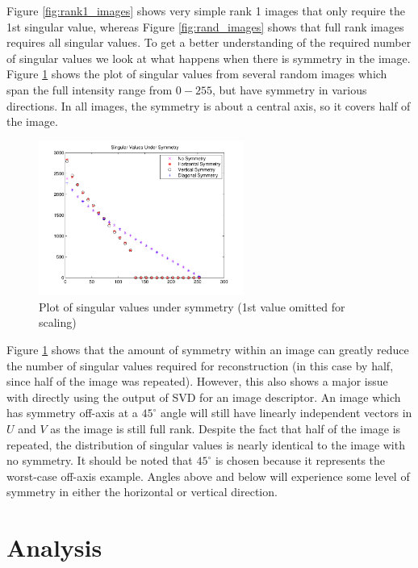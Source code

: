 \documentclass{report}
\begin{document}
Figure \ref{fig:rank1_images} shows very simple rank 1 images that only require the 1st singular value, whereas Figure \ref{fig:rand_images} shows that full rank images requires all singular values. To get a better understanding of the required number of singular values we look at what happens when there is symmetry in the image. Figure \ref{fig:rand_symmetry} shows the plot of singular values from several random images which span the full intensity range from $0-255$, but have symmetry in various directions. In all images, the symmetry is about a central axis, so it covers half of the image.

\begin{figure}[H]
        \centering
        \includegraphics[width=0.6\textwidth]{graphics/singular_values_symmetry.pdf}
        \caption{Plot of singular values under symmetry (1st value omitted for scaling)}
        \label{fig:rand_symmetry}
\end{figure}

Figure \ref{fig:rand_symmetry} shows that the amount of symmetry within an image can greatly reduce the number of singular values required for reconstruction (in this case by half, since half of the image was repeated). However, this also shows a major issue with directly using the output of SVD for an image descriptor. An image which has symmetry off-axis at a $45^\circ$ angle will still have linearly independent vectors in $U$ and $V$ as the image is still full rank. Despite the fact that half of the image is repeated, the distribution of singular values is nearly identical to the image with no symmetry. It should be noted that $45^\circ$ is chosen because it represents the worst-case off-axis example. Angles above and below will experience some level of symmetry in either the horizontal or vertical direction.

\chapter{Analysis}
\end{document}
